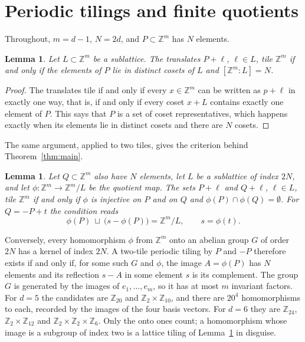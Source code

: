 \documentclass[11pt]{amsart}
\newtheorem{lemma}[theorem]{Lemma}
\theoremstyle{definition}
\theoremstyle{remark}
\newcommand{\Z}{\mathbb{Z}}
\begin{document}
\section{Periodic tilings and finite quotients}\label{sec:quotients}

Throughout, $m=d-1$, $N=2d$, and $P\subset\Z^m$ has $N$ elements.

\begin{lemma}\label{lem:lattice}
Let $L\subset\Z^m$ be a sublattice. The translates $P+\ell$, $\ell\in L$, tile $\Z^m$ if and only if the elements of $P$ lie in distinct cosets of $L$ and $[\Z^m:L]=N$.
\end{lemma}

\begin{proof}
The translates tile if and only if every $x\in\Z^m$ can be written as $p+\ell$ in exactly one way, that is, if and only if every coset $x+L$ contains exactly one element of $P$. This says that $P$ is a set of coset representatives, which happens exactly when its elements lie in distinct cosets and there are $N$ cosets.
\end{proof}

The same argument, applied to two tiles, gives the criterion behind Theorem~\ref{thm:main}.

\begin{lemma}\label{lem:two}
Let $Q\subset\Z^m$ also have $N$ elements, let $L$ be a sublattice of index $2N$, and let $\phi\colon\Z^m\to\Z^m/L$ be the quotient map. The sets $P+\ell$ and $Q+\ell$, $\ell\in L$, tile $\Z^m$ if and only if $\phi$ is injective on $P$ and on $Q$ and $\phi(P)\cap\phi(Q)=\emptyset$. For $Q=-P+t$ the condition reads
\[
\phi(P)\ \sqcup\ \bigl(s-\phi(P)\bigr)=\Z^m/L,\qquad s=\phi(t).
\]
\end{lemma}

Conversely, every homomorphism $\phi$ from $\Z^m$ onto an abelian group $G$ of order $2N$ has a kernel of index $2N$. A two-tile periodic tiling by $P$ and $-P$ therefore exists if and only if, for some such $G$ and $\phi$, the image $A=\phi(P)$ has $N$ elements and its reflection $s-A$ in some element $s$ is its complement. The group $G$ is generated by the images of $e_1,\dots,e_m$, so it has at most $m$ invariant factors. For $d=5$ the candidates are $\Z_{20}$ and $\Z_2\times\Z_{10}$, and there are $20^4$ homomorphisms to each, recorded by the images of the four basis vectors. For $d=6$ they are $\Z_{24}$, $\Z_2\times\Z_{12}$ and $\Z_2\times\Z_2\times\Z_6$. Only the onto ones count; a homomorphism whose image is a subgroup of index two is a lattice tiling of Lemma~\ref{lem:lattice} in disguise.
\end{document}
